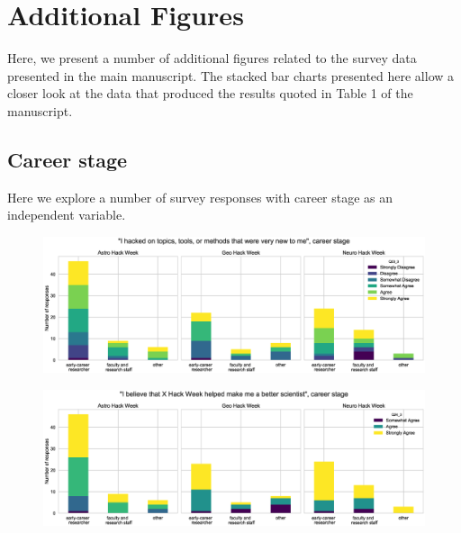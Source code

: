 \documentclass{aastex62}
\begin{document}
\section{Additional Figures}

Here, we present a number of additional figures related to the survey data presented in the main manuscript. The stacked bar charts presented here allow a closer look at the data that produced the results quoted in Table 1 of the manuscript.

\subsection{Career stage}

Here we explore a number of survey responses with career stage as an independent variable.

\begin{figure}[h!]
\centering
\includegraphics[width=\textwidth]{Q23_3_Q3_stackedbars.eps}
\caption{}
\label{fig:survey}
\end{figure}

\begin{figure}[h!]
\centering
\includegraphics[width=\textwidth]{Q24_3_Q3_stackedbars.eps}
\caption{}
\label{fig:survey}
\end{figure}
\end{document}
